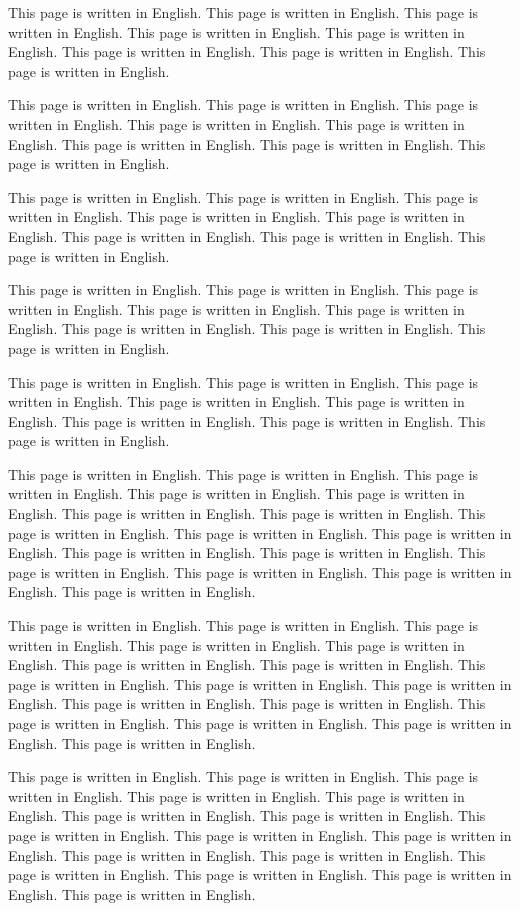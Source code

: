 This page is written in English. This page is written in English. 
This page is written in English. This page is written in English. 
This page is written in English. This page is written in English. 
This page is written in English. This page is written in English. 

This page is written in English. This page is written in English. 
This page is written in English. This page is written in English. 
This page is written in English. This page is written in English. 
This page is written in English. This page is written in English. 

This page is written in English. This page is written in English. 
This page is written in English. This page is written in English. 
This page is written in English. This page is written in English. 
This page is written in English. This page is written in English. 

This page is written in English. This page is written in English. 
This page is written in English. This page is written in English. 
This page is written in English. This page is written in English. 
This page is written in English. This page is written in English. 

This page is written in English. This page is written in English. 
This page is written in English. This page is written in English. 
This page is written in English. This page is written in English. 
This page is written in English. This page is written in English. 

This page is written in English. This page is written in English. 
This page is written in English. This page is written in English. 
This page is written in English. This page is written in English. 
This page is written in English. This page is written in English. 
This page is written in English. This page is written in English. 
This page is written in English. This page is written in English. 
This page is written in English. This page is written in English. 
This page is written in English. This page is written in English. 

This page is written in English. This page is written in English. 
This page is written in English. This page is written in English. 
This page is written in English. This page is written in English. 
This page is written in English. This page is written in English. 
This page is written in English. This page is written in English. 
This page is written in English. This page is written in English. 
This page is written in English. This page is written in English. 
This page is written in English. This page is written in English. 

This page is written in English. This page is written in English. 
This page is written in English. This page is written in English. 
This page is written in English. This page is written in English. 
This page is written in English. This page is written in English. 
This page is written in English. This page is written in English. 
This page is written in English. This page is written in English. 
This page is written in English. This page is written in English. 
This page is written in English. This page is written in English. 
